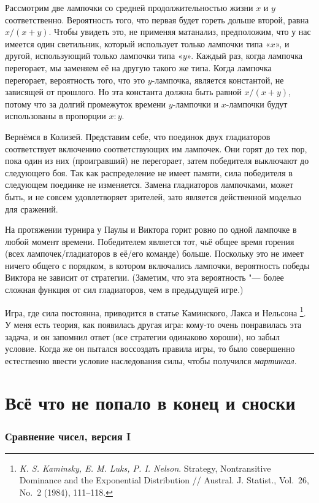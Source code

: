 \documentclass[twoside]{book}
\begin{document}
Рассмотрим две лампочки со средней продолжительностью жизни $x$ и $y$ соответственно.
Вероятность того, что первая будет гореть дольше второй, равна $x/(x+y)$.
Чтобы увидеть это, не применяя матанализ, предположим, что у нас имеется один светильник, который использует только лампочки типа «$x$», и другой, использующий только лампочки типа «$y$».
Каждый раз, когда лампочка перегорает, мы заменяем её на другую такого же типа.
Когда лампочка перегорает, вероятность того, что это $y$-лампочка, является константой, не зависящей от прошлого.
Но эта константа должна быть равной $x/(x+y)$, потому что за долгий промежуток времени $y$-лампочки и $x$-лампочки будут использованы в пропорции $x : y$.

Вернёмся в Колизей.
Представим себе, что поединок двух гладиаторов соответствует включению соответствующих им лампочек.
Они горят до тех пор, пока один из них (проигравший) не перегорает, затем победителя выключают до следующего боя.
Так как распределение не имеет памяти, сила победителя в следующем поединке не изменяется.
Замена гладиаторов лампочками, может быть, и не совсем удовлетворяет зрителей, зато является действенной моделью для сражений.

На протяжении турнира у Паулы и Виктора горит ровно по одной лампочке в любой момент времени.
Победителем является тот, чьё общее время горения (всех лампочек/гладиаторов в её/его команде) больше.
Поскольку это не имеет ничего общего с порядком, в котором включались лампочки, вероятность победы Виктора не зависит от стратегии.
(Заметим, что эта вероятность "--- более сложная функция от сил гладиаторов, чем в предыдущей игре.)
\heart

Игра, где сила постоянна, приводится в статье Каминского, Лакса и Нельсона%
\footnote{\emph{K. S. Kaminsky, E. M. Luks, P. I. Nelson}. Strategy, Nontransitive Dominance and the Exponential Distribution /\!/ {Austral. J. Statist.}, Vol.~26, No.~2 (1984), 111--118.}.
У меня есть теория, как появилась другая игра: кому-то очень понравилась эта задача, и он запомнил ответ (все стратегии одинаково хороши), но забыл условие.
Когда же он пытался воссоздать правила игры, то было совершенно естественно ввести условие наследования силы, чтобы получился \emph{мартингал}.

\section*{Всё что не попало в конец и сноски}

\subsubsection{Сравнение чисел, версия I}
\end{document}
